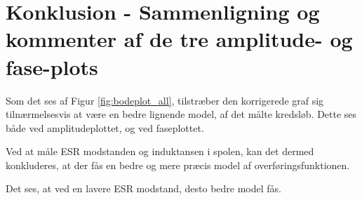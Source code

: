 \section{Konklusion - Sammenligning og kommenter af de tre amplitude- og fase-plots}\label{sec:spm6}

Som det ses af Figur \ref{fig:bodeplot_all}, tilstræber den korrigerede graf sig tilnærmelsesvis at være en bedre lignende model, af det målte kredsløb. Dette ses både ved amplitudeplottet, og ved faseplottet.

Ved at måle ESR modstanden og induktansen i spolen, kan det dermed konkluderes, at der fås en bedre og mere præcis model af overføringsfunktionen. 

Det ses, at ved en lavere ESR modstand, desto bedre model fås. 